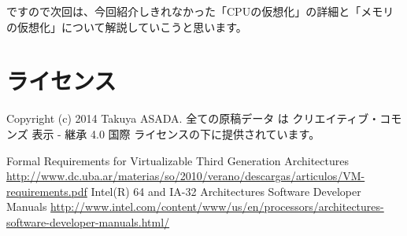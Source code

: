 ですので次回は、今回紹介しきれなかった「CPUの仮想化」の詳細と「メモリの仮想化」について解説していこうと思います。

\section{ライセンス}
Copyright (c) 2014 Takuya ASADA.
全ての原稿データ は クリエイティブ・コモンズ 表示 - 継承 4.0 国際 ライセンスの下に提供されています。

\begin{thebibliography}{4}
   Formal Requirements for Virtualizable Third Generation Architectures \url{http://www.dc.uba.ar/materias/so/2010/verano/descargas/articulos/VM-requirements.pdf}
   Intel(R) 64 and IA-32 Architectures Software Developer Manuals \url{http://www.intel.com/content/www/us/en/processors/architectures-software-developer-manuals.html/}
\end{thebibliography}


